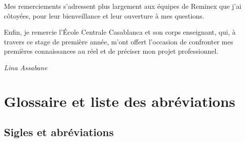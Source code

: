 \documentclass[12pt,a4paper,oneside]{report}
\begin{document}
Mes remerciements s'adressent plus largement aux équipes de Reminex que j'ai côtoyées, pour leur bienveillance et leur ouverture à mes questions.

Enfin, je remercie l'École Centrale Casablanca et son corps enseignant, qui, à travers ce stage de première année, m'ont offert l'occasion de confronter mes premières connaissances au réel et de préciser mon projet professionnel.

\vspace{1cm}
{\raggedleft\itshape Lina Assabane\par}

\chapter*{Glossaire et liste des abréviations}

\section*{Sigles et abréviations}
\end{document}
